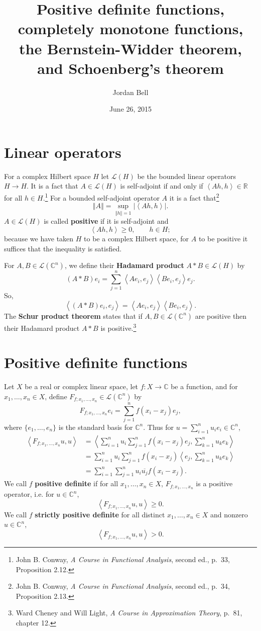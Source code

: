 \documentclass{article}
\newcommand{\inner}[2]{\left\langle #1, #2 \right\rangle}
\newcommand{\norm}[1]{\left\Vert #1 \right\Vert}
\theoremstyle{definition}
\begin{document}
\title{Positive definite functions, completely monotone functions, the Bernstein-Widder theorem, and Schoenberg's theorem}
\author{Jordan Bell}
\date{June 26, 2015}

\maketitle

\section{Linear operators}
For a complex Hilbert space $H$ let $\mathscr{L}(H)$ be the bounded linear operators
$H \to H$. It is a fact that $A \in \mathscr{L}(H)$ is self-adjoint if and only if $\inner{Ah}{h} \in \mathbb{R}$ for all
$h \in H$.\footnote{John B. Conway, {\em A Course in Functional Analysis}, second ed., p.~33, Proposition 2.12.}
For a bounded self-adjoint operator $A$ it is a fact
that\footnote{John B. Conway, {\em A Course in Functional Analysis}, second ed., p.~34, Proposition 2.13.}
\[
\norm{A} = \sup_{\norm{h} = 1} |\inner{Ah}{h}|.
\]
$A \in \mathscr{L}(H)$ is called \textbf{positive} if it is self-adjoint and 
\[
\inner{Ah}{h} \geq 0, \qquad h \in H;
\]
because we have taken $H$ to be a complex Hilbert space,  for $A$ to be positive it suffices that the inequality is satisfied. 

For $A,B \in \mathscr{L}(\mathbb{C}^n)$, we define
their \textbf{Hadamard product} $A * B \in \mathscr{L}(H)$ by
\[
(A*B)e_i = \sum_{j=1}^n \inner{Ae_i}{e_j} \inner{Be_i}{e_j} e_j.
\]
So,
\[
\inner{(A*B)e_i}{e_j} = \inner{Ae_i}{e_j} \inner{Be_i}{e_j}.
\]
The \textbf{Schur product theorem} states that if $A,B \in \mathscr{L}(\mathbb{C}^n)$ are positive then
their Hadamard product $A * B$ is positive.\footnote{Ward Cheney and Will Light, {\em A Course
in Approximation Theory}, p.~81, chapter 12.}


\section{Positive definite functions}
Let $X$ be a real or complex linear space, let  $f:X \to \mathbb{C}$ be a function, and for
$x_1,\ldots,x_n \in X$, define $F_{f;x_1,\ldots,x_n} \in \mathscr{L}(\mathbb{C}^n)$ by
\[
F_{f;x_1,\ldots,x_n}e_i = \sum_{j=1}^n f(x_i-x_j) e_j,
\]
where $\{e_1,\ldots,e_n\}$ is the standard basis for $\mathbb{C}^n$.
 Thus for
$u=\sum_{i=1}^n u_i e_i \in \mathbb{C}^n$,
\begin{align*}
\inner{F_{f;x_1,\ldots,x_n}u}{u}&=\inner{\sum_{i=1}^n u_i \sum_{j=1}^n f(x_i-x_j) e_j}{\sum_{k=1}^n u_k e_k}\\
&=\sum_{i=1}^n u_i \sum_{j=1}^n f(x_i-x_j) \inner{e_j}{\sum_{k=1}^n u_k e_k}\\
&=\sum_{i=1}^n  \sum_{j=1}^n u_i \overline{u_j} f(x_i-x_j).
\end{align*}
We call $f$  \textbf{positive definite} if
for all $x_1,\ldots,x_n \in X$,
$F_{f;x_1,\ldots,x_n}$ is a positive operator, i.e. for
 $u \in \mathbb{C}^n$,
\[
\inner{F_{f;x_1,\ldots,x_n}u}{u} \geq 0.
\]
We call $f$
\textbf{strictly positive definite} for all distinct $x_1,\ldots,x_n \in X$ and nonzero $u \in \mathbb{C}^n$,
\[
\inner{F_{f;x_1,\ldots,x_n}u}{u} >0.
\]
\end{document}
